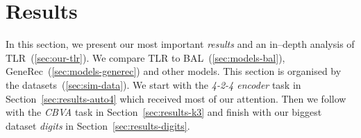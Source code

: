 

\section{Results} 
\label{sec:results} 

In this section, we present our most important \emph{results} and an in--depth analysis of TLR~(\ref{sec:our-tlr}). We compare TLR to BAL~(\ref{sec:models-bal}), GeneRec~(\ref{sec:models-generec}) and other models. This section is organised by the datasets~(\ref{sec:sim-data}). We start with the \emph{4-2-4 encoder} task in Section~\ref{sec:results-auto4} which received most of our attention. Then we follow with the \emph{CBVA} task in Section~\ref{sec:results-k3} and finish with our biggest dataset \emph{digits} in Section~\ref{sec:results-digits}. 

 

 

 

